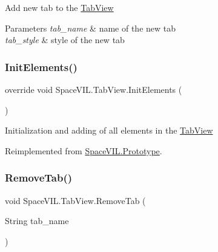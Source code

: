 Add new tab to the \mbox{\hyperlink{class_space_v_i_l_1_1_tab_view}{Tab\+View}} 


\begin{DoxyParams}{Parameters}
{\em tab\+\_\+name} & name of the new tab \\
\hline
{\em tab\+\_\+style} & style of the new tab \\
\hline
\end{DoxyParams}
\mbox{\label{class_space_v_i_l_1_1_tab_view_ae19ec535e78dee9eca9ac433e2b2bca5}} 
\subsubsection{\texorpdfstring{Init\+Elements()}{InitElements()}}
{\footnotesize\ttfamily override void Space\+V\+I\+L.\+Tab\+View.\+Init\+Elements (\begin{DoxyParamCaption}{ }\end{DoxyParamCaption})\hspace{0.3cm}{\ttfamily [virtual]}}



Initialization and adding of all elements in the \mbox{\hyperlink{class_space_v_i_l_1_1_tab_view}{Tab\+View}} 



Reimplemented from \mbox{\hyperlink{class_space_v_i_l_1_1_prototype_ac3379fe02923ee155b5b0084abf27420}{Space\+V\+I\+L.\+Prototype}}.

\mbox{\label{class_space_v_i_l_1_1_tab_view_a5ea4b28772c302bc05b558ac104ea831}} 
\subsubsection{\texorpdfstring{Remove\+Tab()}{RemoveTab()}}
{\footnotesize\ttfamily void Space\+V\+I\+L.\+Tab\+View.\+Remove\+Tab (\begin{DoxyParamCaption}\item[{String}]{tab\+\_\+name }\end{DoxyParamCaption})}



